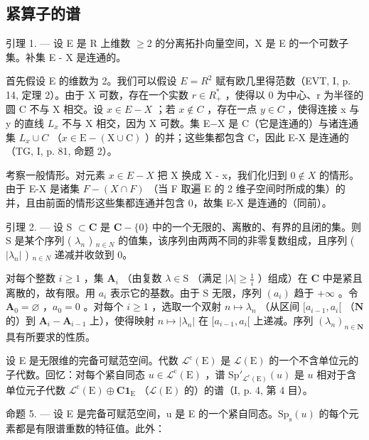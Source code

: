 \subsection{紧算子的谱}

引理 1. --- 设 E 是 R 上维数 \(\geqslant 2\) 的分离拓扑向量空间，X 是 E 的一个可数子集。补集 E - X 是连通的。

首先假设 E 的维数为 2。我们可以假设 \(E = R^{2}\) 赋有欧几里得范数（EVT, I, p. 14, 定理 2）。由于 X 可数，存在一个实数 \(r \in R_{+}^{*}\) ，使得以 0 为中心、r 为半径的圆 C 不与 X 相交。设 \(x \in E - X\) ；若 \(x \notin C\) ，存在一点 \(y \in C\) ，使得连接 x 与 y 的直线 \(L_{x}\) 不与 X 相交，因为 X 可数。集 E−X 是 C（它是连通的）与诸连通集 \(L_{x} \cup C\) （\(x \in \mathrm{E} - (\mathrm{X} \cup \mathrm{C})\) ）的并；这些集都包含 C，因此 E-X 是连通的（TG, I, p. 81, 命题 2）。

考察一般情形。对元素 \(x \in E - X\) 把 X 换成 X - x，我们化归到 \(0 \notin X\) 的情形。由于 E-X 是诸集 \(F - (X \cap F)\) （当 F 取遍 E 的 2 维子空间时所成的集）的并，且由前面的情形这些集都连通并包含 0，故集 E-X 是连通的（同前）。

引理 2. --- 设 S \(\subset \mathbf{C}\) 是 \(\mathbf{C} - \{0\}\) 中的一个无限的、离散的、有界的且闭的集。则 S 是某个序列 ( \(\lambda_{n}\) ) \(_{n\in N}\) 的值集，该序列由两两不同的非零复数组成，且序列 ( \(|\lambda_{n}|\) ) \(_{n\in N}\) 递减并收敛到 0。

对每个整数 \(i \geqslant 1\) ，集 \(\mathbf{A}_i\) （由复数 \(\lambda \in \mathrm{S}\) （满足 \(|\lambda| \geqslant \frac{1}{i}\) ）组成）在 \(\mathbf{C}\) 中是紧且离散的，故有限。用 \(a_i\) 表示它的基数。由于 S 无限，序列 \((a_i)\) 趋于 \(+\infty\) 。令 \(\mathbf{A}_0 = \varnothing\) ，\(a_0 = 0\) 。对每个 \(i \geqslant 1\) ，选取一个双射 \(n \mapsto \lambda_n\) （从区间 \([a_{i-1}, a_i[\) （\(\mathbf{N}\) 的）到 \(\mathbf{A}_i - \mathbf{A}_{i-1}\) 上），使得映射 \(n \mapsto |\lambda_n|\) 在 \([a_{i-1}, a_i[\) 上递减。序列 \((\lambda_n)_{n \in \mathbf{N}}\) 具有所要求的性质。

设 E 是无限维的完备可赋范空间。代数 \(\mathcal{L}^{\mathrm{c}}(\mathrm{E})\) 是 \(\mathcal{L}(\mathrm{E})\) 的一个不含单位元的子代数。回忆：对每个紧自同态 \(u \in \mathcal{L}^{\mathrm{c}}(\mathrm{E})\) ，谱 \(\mathrm{Sp}'_{\mathcal{L}^{\mathrm{c}}(\mathrm{E})}(u)\) 是 \(u\) 相对于含单位元子代数 \(\mathcal{L}^{\mathrm{c}}(\mathrm{E}) \oplus \mathbf{C1}_{\mathrm{E}}\) （\(\mathcal{L}(\mathrm{E})\) 的）的谱（I, p. 4, 第 4 目）。

命题 5. — 设 E 是完备可赋范空间，u 是 E 的一个紧自同态。\(\mathrm{Sp}_{\mathrm{s}}(u)\) 的每个元素都是有限谱重数的特征值。此外：

